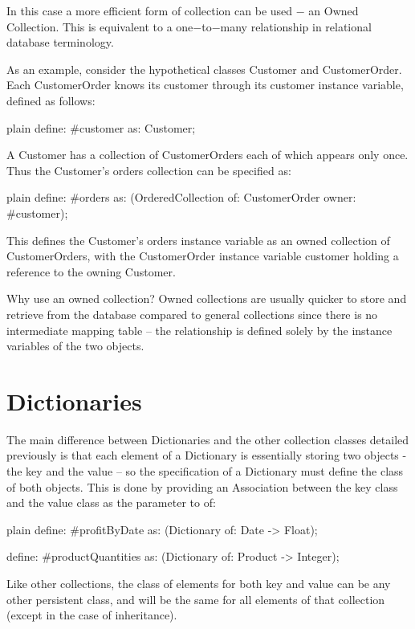 \documentclass[10pt,twoside,english]{_support/latex/sbabook/sbabook}
\begin{document}
In this case a more efficient form of collection can be used − an Owned Collection. This is equivalent to a one−to−many relationship in relational database terminology. 

As an example, consider the hypothetical classes Customer and CustomerOrder. Each CustomerOrder knows its customer through its customer instance variable, defined as follows: 

\begin{displaycode}{plain}
	define: #customer as: Customer;
\end{displaycode}

A Customer has a collection of CustomerOrders each of which appears only once. Thus the Customer's orders collection can be specified as: 

\begin{displaycode}{plain}
	define: #orders as: (OrderedCollection of: CustomerOrder owner: #customer);
\end{displaycode}

This defines the Customer’s orders instance variable as an owned collection of CustomerOrders, with the CustomerOrder instance variable customer holding a reference to the owning Customer. 

Why use an owned collection? Owned collections are usually quicker to store and retrieve from the database compared to general collections since there is no intermediate mapping table – the relationship is defined solely by the instance variables of the two objects.
 
\section{Dictionaries}
The main difference between Dictionaries and the other collection classes detailed previously is that each element of a Dictionary is essentially storing two objects - the key and the value – so the specification of a Dictionary must define the class of both objects. This is done by providing an Association between the key class and the value class as the parameter to of:

\begin{displaycode}{plain}
define: #profitByDate as: (Dictionary of: Date -> Float);

define: #productQuantities as: (Dictionary of: Product -> Integer);
\end{displaycode}

Like other collections, the class of elements for both key and value can be any other persistent class, and will be the same for all elements of that collection (except in the case of inheritance).
 
\end{document}
